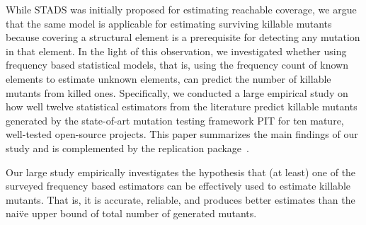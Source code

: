 \documentclass[sigconf,review,anonymous]{acmart}
\newcommand{\estimatorCount}{twelve\xspace}
\newcommand{\projectCount}{ten\xspace}
\newcommand{\PIT}{\textsc{PIT}\xspace}
\begin{document}
While STADS was initially proposed for estimating reachable coverage,
we argue %
that the same model is applicable for estimating surviving killable mutants %
because covering a structural element is a prerequisite for detecting any
mutation in that element. 
%
In the light of this observation, %
%
we investigated whether using frequency based
statistical models, that is, using the frequency count of known elements
to estimate unknown elements, can predict the number of killable
mutants from killed ones.
%
%
%
%
Specifically, we conducted a large empirical study on how well
\estimatorCount statistical estimators from the literature predict killable mutants
generated by the state-of-art mutation testing framework \PIT\cite{pit}
for \projectCount  mature, well-tested open-source projects. %
This paper summarizes 
the main findings of our study and is complemented by
the replication package~\cite{replication-package}.

\begin{tcolorbox}[boxrule=0.5pt, arc=4pt, boxsep=0pt, width=\columnwidth]
Our large study empirically investigates the hypothesis that (at least)
one of the surveyed frequency based estimators can be effectively used to
estimate killable mutants.
That is, it is accurate, reliable, and
produces better estimates than the nai\"ve upper bound of total
number of generated mutants.
\end{tcolorbox}
\end{document}
